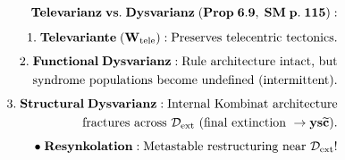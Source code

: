 \documentclass[preview]{standalone}
\begin{document}
\begin{align*}
\special{dvisvgm:raw <g id='unique000'>}\mathbf{Televarianz\;vs.\;Dysvarianz\;(Prop\;6.9,\;SM\;p.\;115):}\\[5pt]1.\;\mathbf{Televariante\;(\mathbf{W}_{\text{tele}}):}\;\text{Preserves telecentric tectonics.}\\[4pt]2.\;\mathbf{Functional\;Dysvarianz:}\;\text{Rule architecture intact, but}\\\;\;\text{syndrome populations become undefined (intermittent).}\\[4pt]3.\;\mathbf{Structural\;Dysvarianz:}\;\text{Internal Kombinat architecture}\\\;\;\text{fractures across }\mathcal{D}_{\text{ext}}\text{ (final extinction }\to\mathbf{ys}\widetilde{\mathbf{c}}\text{).}\\[4pt]\bullet\;\mathbf{Resynkolation:}\;\text{Metastable restructuring near }\mathcal{D}_{\text{ext}}!\special{dvisvgm:raw </g>}
\end{align*}
\end{document}
